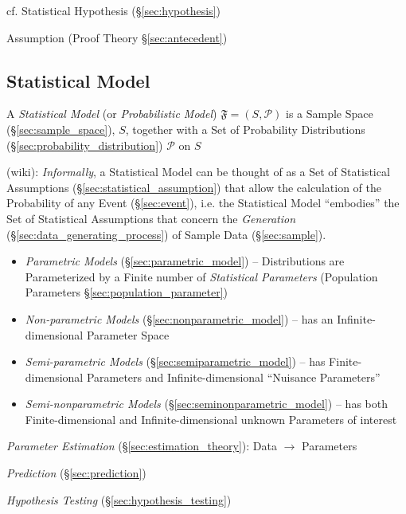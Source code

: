 cf. Statistical Hypothesis (\S\ref{sec:hypothesis})

\fist Assumption (Proof Theory \S\ref{sec:antecedent})



\subsection{Statistical Model}\label{sec:statistical_model}

A \emph{Statistical Model} (or \emph{Probabilistic Model})
$\mathfrak{F} = (S,\mathcal{P})$ is a Sample Space (\S\ref{sec:sample_space}),
$S$, together with a Set of Probability Distributions
(\S\ref{sec:probability_distribution}) $\mathcal{P}$ on $S$

(wiki): \emph{Informally}, a Statistical Model can be thought of as a Set of
Statistical Assumptions (\S\ref{sec:statistical_assumption}) that allow the
calculation of the Probability of any Event (\S\ref{sec:event}), i.e. the
Statistical Model ``embodies'' the Set of Statistical Assumptions that concern
the \emph{Generation} (\S\ref{sec:data_generating_process}) of Sample Data
(\S\ref{sec:sample}).

\begin{itemize}
  \item \emph{Parametric Models} (\S\ref{sec:parametric_model}) -- Distributions
    are Parameterized by a Finite number of \emph{Statistical Parameters}
    (Population Parameters \S\ref{sec:population_parameter})
  \item \emph{Non-parametric Models} (\S\ref{sec:nonparametric_model})
    -- has an Infinite-dimensional Parameter Space
  \item \emph{Semi-parametric Models} (\S\ref{sec:semiparametric_model}) -- has
    Finite-dimensional Parameters and Infinite-dimensional
    ``Nuisance Parameters''
  \item \emph{Semi-nonparametric Models} (\S\ref{sec:seminonparametric_model})
    -- has both Finite-dimensional and Infinite-dimensional unknown Parameters
    of interest
\end{itemize}

\emph{Parameter Estimation} (\S\ref{sec:estimation_theory}): Data $\to$
Parameters

\emph{Prediction} (\S\ref{sec:prediction})

\emph{Hypothesis Testing} (\S\ref{sec:hypothesis_testing})

